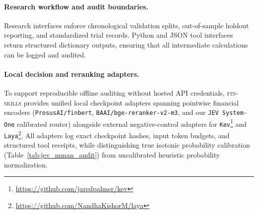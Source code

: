 \paragraph{Research workflow and audit boundaries.}
Research interfaces enforce chronological validation splits, out-of-sample holdout
reporting, and standardized trial records. Python and JSON tool interfaces return
structured dictionary outputs, ensuring that all intermediate calculations can be logged
and audited.

\paragraph{Local decision and reranking adapters.}
To support reproducible offline auditing without hosted API credentials, \textsc{fin-skills} provides unified local checkpoint adapters spanning pointwise financial encoders (\texttt{ProsusAI/finbert}, \texttt{BAAI/bge-reranker-v2-m3}, and our \texttt{JEV System-One} calibrated router) alongside external negative-control adapters for \texttt{Kev}\footnote{\url{https://github.com/jaredpalmer/kev}} and \texttt{Laya}\footnote{\url{https://github.com/NandhaKishorM/laya}}. All adapters log exact checkpoint hashes, input token budgets, and structured tool receipts, while distinguishing true isotonic probability calibration (Table~\ref{tab:jev_mman_audit}) from uncalibrated heuristic probability normalization.

